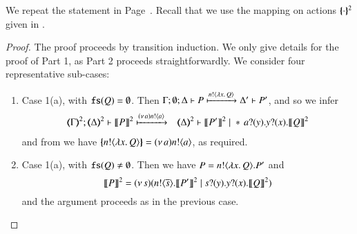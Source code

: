 
We repeat the statement in Page~\pageref{prop:op_corr_HOp_to_p}. 
Recall that we use the mapping on actions $\{\!\!\{\cdot\}\!\!\}^{2}$ given in .

\begin{proposition}\myrm
	\label{app:prop:op_corr_HOp_to_p}

\end{proposition}


\begin{proof}
	\noi The proof proceeds by transition induction.
	We only give details for the proof of Part 1, as Part 2 proceeds straightforwardly.
%
    We consider four representative sub-cases:
    \begin{enumerate}[1.]
	\item Case 1(a), with $\mathtt{fs}(Q) = \emptyset$. 
Then
		$\Gamma; \emptyset; \Delta \vdash P \xmapsto{n !\langle \lambda x.\,Q \rangle}  \Delta' \vdash P'$, 
		and so we infer
					\begin{eqnarray*}
		\tmap{\Gamma}{2};  \tmap{\Delta}{2} \proves \pmap{P}{2} &\hby{\news{a} \bactout{n}{a}}& \tmap{\Delta}{2} \proves \pmap{P'}{2} \Par \repl{} \binp{a}{y} \binp{y}{x} \pmap{Q}{2}
	\end{eqnarray*}
%
	\noi and from  we have 		$\{\!\!\{n ! \langle \lambda x.\,Q \rangle\}\!\!\} = (\nu\, a) n ! \langle a \rangle$, 
as required.

	\item Case 1(a), with $\mathtt{fs}(Q) \neq \emptyset$. Then we have $P= n ! \langle \lambda x.\,Q \rangle . P'$ 
and
	$$\llbracket P\rrbracket^2 = (\nu\, s)(n ! \langle \overline{s} \rangle . \llbracket P'\rrbracket^2 \;|\; s ? (y) . y ? (x) . \llbracket Q\rrbracket^2)$$
	and the argument proceeds as in the previous case.


\end{enumerate}
\end{proof}
